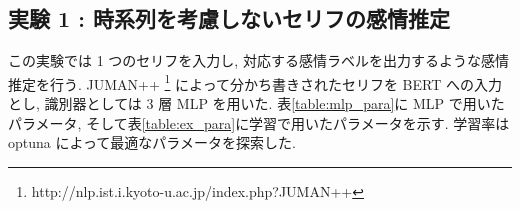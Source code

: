 \documentclass[twocolumn]{jarticle}     %
\begin{document}
\begin{table}[t]
\centering
\caption{データ数}
\label{table:data_size}
\end{table}

\subsection{\small{実験 1 : 時系列を考慮しないセリフの感情推定}}
この実験では 1 つのセリフを入力し, 対応する感情ラベルを出力するような感情推定を行う. JUMAN++ \footnote{http://nlp.ist.i.kyoto-u.ac.jp/index.php?JUMAN++} によって分かち書きされたセリフを BERT への入力とし, 識別器としては 3 層 MLP を用いた. 表\ref{table:mlp_para}に MLP で用いたパラメータ, そして表\ref{table:ex_para}に学習で用いたパラメータを示す. 学習率は optuna によって最適なパラメータを探索した.
\end{document}
